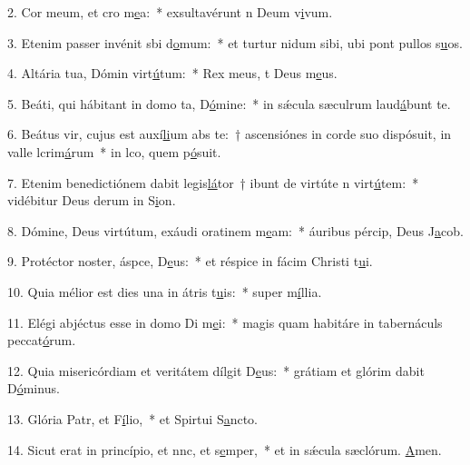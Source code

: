 2. Cor meum, et cro m\uline{e}a:~* exsultavérunt n Deum v\uline{i}vum.\par 
3. Etenim passer invénit sbi d\uline{o}mum:~* et turtur nidum sibi, ubi pont pullos s\uline{u}os.\par 
4. Altária tua, Dómin virt\uline{ú}tum:~* Rex meus, t Deus m\uline{e}us.\par 
5. Beáti, qui hábitant in domo ta, D\uline{ó}mine:~* in sǽcula sæculrum laud\uline{á}bunt te.\par 
6. Beátus vir, cujus est auxí\uline{li}um abs te:~† ascensiónes in corde suo dispósuit, in valle lcrim\uline{á}rum~* in lco, quem p\uline{ó}suit.\par 
7. Etenim benedictiónem dabit legis\uline{lá}tor~† ibunt de virtúte n virt\uline{ú}tem:~* vidébitur Deus derum in S\uline{i}on.\par 
8. Dómine, Deus virtútum, exáudi oratinem m\uline{e}am:~* áuribus pércip, Deus J\uline{a}cob.\par 
9. Protéctor noster, áspce, D\uline{e}us:~* et réspice in fácim Christi t\uline{u}i.\par 
10. Quia mélior est dies una in átris t\uline{u}is:~* super m\uline{í}llia.\par 
11. Elégi abjéctus esse in domo Di m\uline{e}i:~* magis quam habitáre in tabernáculs peccat\uline{ó}rum.\par 
12. Quia misericórdiam et veritátem dílgit D\uline{e}us:~* grátiam et glórim dabit D\uline{ó}minus.\par 
13. Glória Patr, et F\uline{í}lio,~* et Spirtui S\uline{a}ncto.\par 
14. Sicut erat in princípio, et nnc, et s\uline{e}mper,~* et in sǽcula sæclórum. \uline{A}men.\par 
